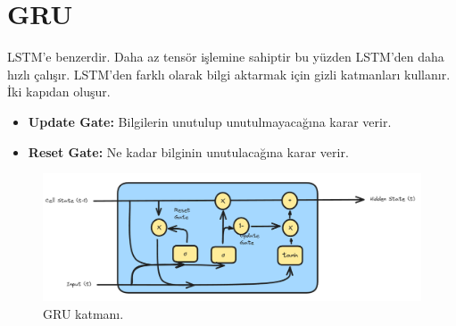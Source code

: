 \section{GRU}
LSTM'e benzerdir. Daha az tensör işlemine sahiptir bu yüzden LSTM'den daha hızlı çalışır. LSTM'den farklı olarak bilgi aktarmak için gizli katmanları kullanır. İki kapıdan oluşur.

\begin{itemize}
    \item \textbf{Update Gate:} Bilgilerin unutulup unutulmayacağına karar verir.
    \item \textbf{Reset Gate:} Ne kadar bilginin unutulacağına karar verir.
\end{itemize}

\begin{figure}[h]
    \centering
    \includegraphics[width=1\textwidth]{images/gru_layer.png}
    \caption{GRU katmanı.}
    \label{fig:enter-label}
\end{figure}

\newpage